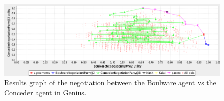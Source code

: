 \documentclass[a4paper]{article}
\begin{document}
\begin{figure}[h!]
\centering
\includegraphics[width=125mm]{boulvsconcede.png}
\caption{Results graph of the negotiation between the Boulware agent vs the Conceder agent in Genius.}
\label{fig:Boulware vs Conceder agent}
\end{figure}
\end{document}
